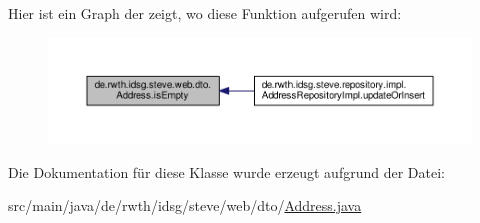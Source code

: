 Hier ist ein Graph der zeigt, wo diese Funktion aufgerufen wird\-:\nopagebreak
\begin{figure}[H]
\begin{center}
\leavevmode
\includegraphics[width=350pt]{classde_1_1rwth_1_1idsg_1_1steve_1_1web_1_1dto_1_1_address_a668f749a007b2fd494a6206a4a86c062_icgraph}
\end{center}
\end{figure}




Die Dokumentation für diese Klasse wurde erzeugt aufgrund der Datei\-:\begin{DoxyCompactItemize}
\item 
src/main/java/de/rwth/idsg/steve/web/dto/\hyperlink{_address_8java}{Address.\-java}\end{DoxyCompactItemize}
